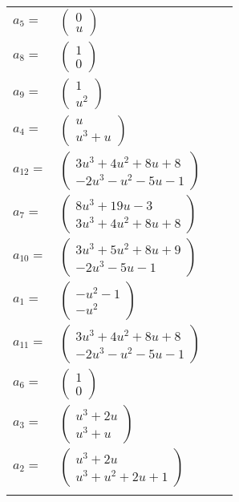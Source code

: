 \documentclass[1p]{elsarticle_modified}
\theoremstyle{definition}
\begin{document}
\begin{tabular}{m{7pt} m{180pt} m{7pt} m{180pt} }
\flushright $a_{5}=$&$\begin{pmatrix}0\\u\end{pmatrix}$ \\
\flushright $a_{8}=$&$\begin{pmatrix}1\\0\end{pmatrix}$ \\
\flushright $a_{9}=$&$\begin{pmatrix}1\\u^2\end{pmatrix}$ \\
\flushright $a_{4}=$&$\begin{pmatrix}u\\u^3+u\end{pmatrix}$ \\
\flushright $a_{12}=$&$\begin{pmatrix}3 u^3+4 u^2+8 u+8\\-2 u^3- u^2-5 u-1\end{pmatrix}$ \\
\flushright $a_{7}=$&$\begin{pmatrix}8 u^3+19 u-3\\3 u^3+4 u^2+8 u+8\end{pmatrix}$ \\
\flushright $a_{10}=$&$\begin{pmatrix}3 u^3+5 u^2+8 u+9\\-2 u^3-5 u-1\end{pmatrix}$ \\
\flushright $a_{1}=$&$\begin{pmatrix}- u^2-1\\- u^2\end{pmatrix}$ \\
\flushright $a_{11}=$&$\begin{pmatrix}3 u^3+4 u^2+8 u+8\\-2 u^3- u^2-5 u-1\end{pmatrix}$ \\
\flushright $a_{6}=$&$\begin{pmatrix}1\\0\end{pmatrix}$ \\
\flushright $a_{3}=$&$\begin{pmatrix}u^3+2 u\\u^3+u\end{pmatrix}$ \\
\flushright $a_{2}=$&$\begin{pmatrix}u^3+2 u\\u^3+u^2+2 u+1\end{pmatrix}$\\&\end{tabular}
\end{document}
